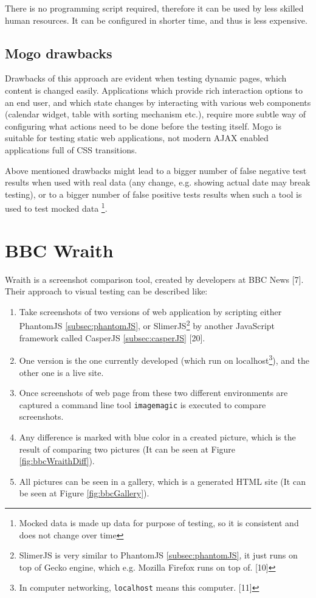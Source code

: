 \documentclass[11pt,oneside,final]{fithesis2}
\begin{document}
  There is no programming script required, therefore it can be used by less skilled human resources. It can be configured in shorter time, and thus is less expensive.
  
  \subsection{Mogo drawbacks}
  
  Drawbacks of this approach are evident when testing dynamic pages, which content is changed easily. Applications which provide rich interaction options to an end user, and which state
  changes by interacting with various web components (calendar widget, table with sorting mechanism etc.), require more subtle way of configuring what actions need to be done before the
  testing itself. Mogo is suitable for testing static web applications, not modern AJAX enabled applications full of CSS transitions.
  
  Above mentioned drawbacks might lead to a bigger number of false negative test results when used with real data (any change, e.g. showing actual date may break testing), or to a bigger 
  number of false positive tests results when such a tool is used to test mocked data \footnote{Mocked data is made up data for purpose of testing, so it is consistent and does not 
  change over time}.
  
  \section{BBC Wraith}
  Wraith is a screenshot comparison tool, created by developers at BBC News [7]. Their approach to visual testing can be described like:
  \begin{enumerate}
   \item Take screenshots of two versions of web application by scripting either PhantomJS \ref{subsec:phantomJS}, or SlimerJS\footnote{SlimerJS is 
   very similar to PhantomJS \ref{subsec:phantomJS}, it just runs on top of Gecko engine, which e.g. Mozilla Firefox runs on top of. [10]} by another JavaScript framework called 
   CasperJS \ref{subsec:casperJS} [20].
   \item One version is the one currently developed (which run on localhost\footnote{In computer networking, \texttt{localhost} means this computer. [11]}), and the other one is a live site.
   \item Once screenshots of web page from these two different environments are captured a command line tool \texttt{imagemagic} is executed to compare screenshots.
   \item Any difference is marked with blue color in a created picture, which is the result of comparing two pictures (It can be seen at Figure \ref{fig:bbcWraithDiff}).
   \item All pictures can be seen in a gallery, which is a generated HTML site (It can be seen at Figure \ref{fig:bbcGallery}).
  \end{enumerate}
  
\end{document}

